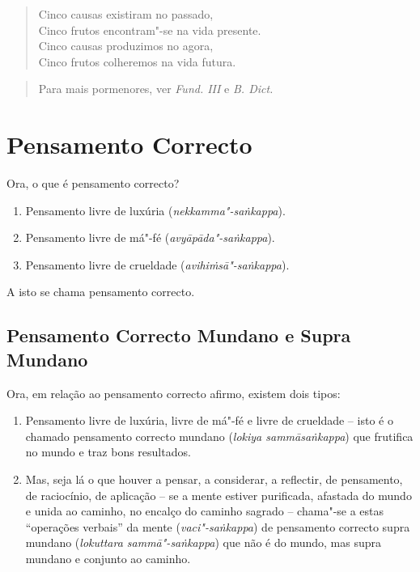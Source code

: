 \begin{verse}
  Cinco causas existiram no passado,\\
  Cinco frutos encontram"-se na vida presente.\\
  Cinco causas produzimos no agora,\\
  Cinco frutos colheremos na vida futura. 
\end{verse}

\begin{quote}
  Para mais pormenores, ver \emph{Fund. III} e \emph{B. Dict.}
\end{quote}

\clearpage

\section{Pensamento Correcto}



Ora, o que é pensamento correcto?

\begin{enumerate}

  \item Pensamento livre de luxúria (\emph{nekkamma"-saṅkappa}).
  \item Pensamento livre de má"-fé (\emph{avyāpāda"-saṅkappa}).
  \item Pensamento livre de crueldade (\emph{avihiṁsā"-saṅkappa}).

\end{enumerate}

A isto se chama pensamento correcto.


\subsection{Pensamento Correcto Mundano e Supra Mundano}

Ora, em relação ao pensamento correcto afirmo, existem dois tipos:

\begin{enumerate}

  \item Pensamento livre de luxúria, livre de má"-fé e livre de crueldade -- isto
        é o chamado pensamento correcto mundano (\emph{lokiya sammāsaṅkappa})
        que frutifica no mundo e traz bons resultados.

  \item Mas, seja lá o que houver a pensar, a considerar, a reflectir, de
        pensamento, de raciocínio, de aplicação -- se a mente estiver
        purificada, afastada do mundo e unida ao caminho, no encalço do caminho
        sagrado -- chama"-se a estas “operações verbais” da mente (\emph{vaci"-saṅkappa}) de pensamento correcto supra mundano (\emph{lokuttara
        sammā"-saṅkappa}) que não é do mundo, mas supra mundano e conjunto ao
        caminho.

\end{enumerate}

